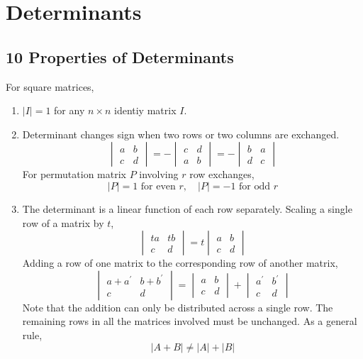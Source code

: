 \documentclass[../linear-algebra.tex]{subfiles}
\begin{document}
\section{Determinants}
\subsection{10 Properties of Determinants}
For square matrices,
\begin{enumerate}
    \item $|I|=1$ for any $n\times n$ identiy matrix $I$.
    
    \item Determinant changes sign when two rows or two columns are exchanged.
    \[\begin{vmatrix} a & b \\ c & d \end{vmatrix} = - \begin{vmatrix} c & d \\ a & b \end{vmatrix} = - \begin{vmatrix} b & a \\ d & c \end{vmatrix}\]
    For permutation matrix $P$ involving $r$ row exchanges,
    \[|P| = 1 \text{ for even } r,\quad |P| = -1 \text{ for odd } r \]
    
    \item The determinant is a linear function of each row separately.\newline
    Scaling a single row of a matrix by $t$,
    \[\begin{vmatrix} ta & tb \\ c & d \end{vmatrix} = t \begin{vmatrix} a & b \\ c & d \end{vmatrix}\]
    Adding a row of one matrix to the corresponding row of another matrix,
    \[\begin{vmatrix} a+a^{\prime} & b+b^{\prime} \\ c & d \end{vmatrix} = \begin{vmatrix} a & b \\ c & d \end{vmatrix} + \begin{vmatrix} a^{\prime} & b^{\prime} \\ c & d \end{vmatrix}\]
    Note that the addition can only be distributed across a single row. The remaining rows in all the matrices involved must be unchanged.
    As a general rule,
    \[|A + B| \neq |A| + |B|\]
    

\end{enumerate}
\end{document}
